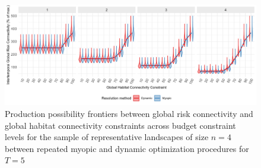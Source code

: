 \begin{figure}[H]
    \centering
    \includegraphics[width=\textwidth]{figures/wildland/dynamic_v_myopic_fpp.jpg}
    \caption{Production possibility frontiers between global risk connectivity and global habitat connectivity constraints across budget constraint levels for the sample of representative landscapes of size $n=4$ between repeated myopic and dynamic optimization procedures for $T=5$}
    \label{fig:appendix_fpp_dyn_myopic}
\end{figure}
\clearpage


